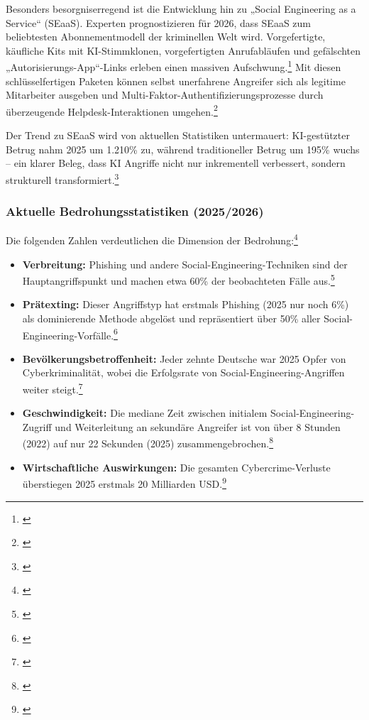 \documentclass[10pt,a4paper]{article}
\begin{document}
	Besonders besorgniserregend ist die Entwicklung hin zu „Social Engineering as a Service“ (SEaaS). Experten prognostizieren für 2026, dass SEaaS zum beliebtesten Abonnementmodell der kriminellen Welt wird. Vorgefertigte, käufliche Kits mit KI-Stimmklonen, vorgefertigten Anrufabläufen und gefälschten „Autorisierungs-App“-Links erleben einen massiven Aufschwung.\footnote{\cite{Forescout2026}} Mit diesen schlüsselfertigen Paketen können selbst unerfahrene Angreifer sich als legitime Mitarbeiter ausgeben und Multi-Faktor-Authentifizierungsprozesse durch überzeugende Helpdesk-Interaktionen umgehen.\footnote{\cite{Forescout2026}} 
	
	Der Trend zu SEaaS wird von aktuellen Statistiken untermauert: KI-gestützter Betrug nahm 2025 um 1.210\% zu, während traditioneller Betrug um 195\% wuchs – ein klarer Beleg, dass KI Angriffe nicht nur inkrementell verbessert, sondern strukturell transformiert.\footnote{\cite{AxisStats}}
	
	\subsubsection{Aktuelle Bedrohungsstatistiken (2025/2026)}
	Die folgenden Zahlen verdeutlichen die Dimension der Bedrohung:\footnote{\cite{BSICyberMonitor,AxisStats,ENISAThreat}}
	\begin{itemize}
		\item \textbf{Verbreitung:} Phishing und andere Social-Engineering-Techniken sind der Hauptangriffspunkt und machen etwa 60\% der beobachteten Fälle aus.\footnote{\cite{ENISAThreat}}
		\item \textbf{Prätexting:} Dieser Angriffstyp hat erstmals Phishing (2025 nur noch 6\%) als dominierende Methode abgelöst und repräsentiert über 50\% aller Social-Engineering-Vorfälle.\footnote{\cite{AxisStats}}
		\item \textbf{Bevölkerungsbetroffenheit:} Jeder zehnte Deutsche war 2025 Opfer von Cyberkriminalität, wobei die Erfolgsrate von Social-Engineering-Angriffen weiter steigt.\footnote{\cite{BSICyberMonitor}}
		\item \textbf{Geschwindigkeit:} Die mediane Zeit zwischen initialem Social-Engineering-Zugriff und Weiterleitung an sekundäre Angreifer ist von über 8 Stunden (2022) auf nur 22 Sekunden (2025) zusammengebrochen.\footnote{\cite{AxisStats}}
		\item \textbf{Wirtschaftliche Auswirkungen:} Die gesamten Cybercrime-Verluste überstiegen 2025 erstmals 20 Milliarden USD.\footnote{\cite{AxisStats}}
	\end{itemize}
	
\end{document}
